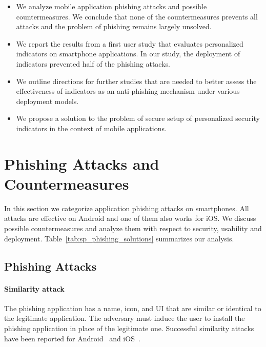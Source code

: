 \begin{itemize}
	\item We analyze mobile application phishing attacks and possible countermeasures. We conclude that none of the countermeasures prevents all attacks and the problem of phishing remains largely unsolved.
	\item We report the results from a first user study that evaluates personalized indicators on smartphone applications. In our study, the deployment of indicators prevented half of the phishing attacks.
	\item We outline directions for further studies that are needed to better assess the effectiveness of indicators as an anti-phishing mechanism under various deployment models.
    \item We propose a solution to the problem of secure setup of personalized security indicators in the context of mobile applications.
\end{itemize}

\section{Phishing Attacks and Countermeasures}
\label{sec:sp_phishing_comparison}

In this section we categorize application phishing attacks on smartphones. All
attacks are effective on Android and one of them also works for iOS. We discuss
possible countermeasures and analyze them with respect to security, usability
and deployment. Table~\ref{tab:sp_phishing_solutions} summarizes our analysis.

\subsection{Phishing Attacks}
\label{subsec:sp_phishing_attacks}

\paragraph{Similarity attack} The phishing application has a name, icon, and
UI that are similar or identical to the legitimate application. The adversary
must induce the user to install the phishing application in place of the
legitimate one.
Successful similarity attacks have been reported for Android~\cite{droid09, securelist, digitaltrends,forbes} and iOS~\cite{macrumors}.

